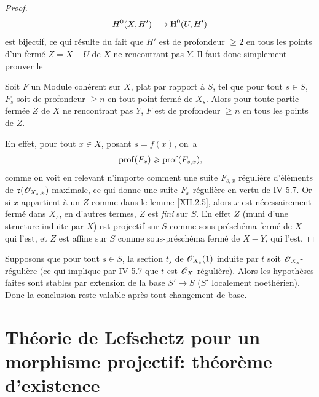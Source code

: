 \begin{proof}
\[
H^0(X, H')\to\H^0(U, H')
\]
est bijectif, ce qui r\'esulte du fait que $H'$ est de profondeur $\geq 2$ en tous les points d'un ferm\'e $Z=X- U$ de $X$ ne rencontrant pas $Y$. Il faut donc simplement prouver le

\begin{lemme} \label{XII.2.5} Soit $F$ un Module coh\'erent sur $X$, plat par rapport \`a $S$, tel que pour tout $s\in S$, $F_s$ soit de profondeur $\geq n$ en tout point ferm\'e de $X_s$. Alors pour toute partie ferm\'ee $Z$ de $X$ ne rencontrant pas $Y$, $F$ est de profondeur $\geq n$ en tous les points de $Z$.
\end{lemme}

En effet, pour tout $x\in X$, posant $s=f(x)$, on~a
\steco
\begin{equation} \label{eq:XII.16} {}\operatorname{prof}(F_x)\geqslant \operatorname{prof}(F_{s, x}),
\end{equation}
comme on voit en relevant n'importe comment une suite $F_{s, x}$ r\'eguli\`ere d'\'el\'ements de $\mathfrak{r}({\mathscr O}_{X_s, x})$ maximale, ce qui donne une suite $F_x$-r\'eguli\`ere en vertu de  IV 5.7. Or si $x$ appartient \`a un $Z$ comme dans le lemme \ref{XII.2.5}, alors $x$ est n\'ecessairement ferm\'e dans $X_s$, en d'autres termes, $Z$ est \emph{fini} sur $S$. En effet $Z$ (muni d'une structure induite par $X$) est projectif sur $S$ comme sous-pr\'esch\'ema ferm\'e de $X$ qui l'est, et $Z$ est affine sur $S$ comme sous-pr\'esch\'ema ferm\'e de $X- Y$, qui l'est.
\skipqed
\end{proof}

\begin{remarque} \label{XII.2.6}
Supposons que pour tout $s\in S$, la section $t_s$ de ${\mathscr O}_{X_s}(1)$ induite par $t$ soit ${\mathscr O}_{X_s}$-r\'eguli\`ere (ce qui implique par  IV 5.7 que $t$ est $\mathscr{O}_X$-r\'eguli\`ere). Alors les hypoth\`eses faites sont stables par extension de la base $S'\to S$ ($S'$ localement noeth\'erien). Donc la conclusion reste valable apr\`es tout changement de base.
\end{remarque}

\section[Th\'eorie de Lefschetz pour un morphisme projectif: existence]{Th\'eorie de Lefschetz pour un morphisme projectif: th\'eor\`eme d'existence}\label{XII.3}%


